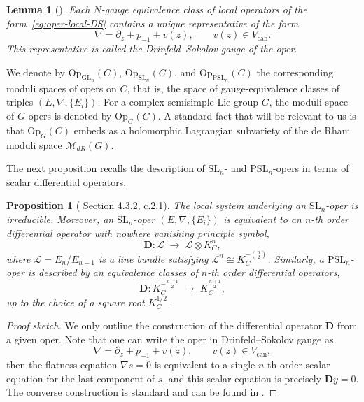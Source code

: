 \documentclass[twoside, 11pt]{article}
\numberwithin{equation}{section}
\theoremstyle{theorem}
\numberwithin{theorem}{section}
\newtheorem{lemma}[lemma]{Lemma}
\newtheorem{proposition}[proposition]{Proposition}
\theoremstyle{definition}
\begin{document}
\begin{lemma}[\cite{BD05}]\label{lem:DS-gauge}
Each $N$-gauge equivalence class of local operators of the form~\eqref{eq:oper-local-DS}
contains a unique representative of the form
\[
\nabla=\partial_z+p_{-1}+v(z),
\qquad v(z)\in V_{\mathrm{can}}.
\]
This representative is called the \emph{Drinfeld--Sokolov gauge} of the oper.
\end{lemma}

We denote by $\mathrm{Op}_{\mathrm{GL}_n}(C)$, $\mathrm{Op}_{\mathrm{SL}_n}(C)$, and $\mathrm{Op}_{\mathrm{PSL}_n}(C)$ the corresponding moduli spaces of opers on $C$, that is, the space of gauge-equivalence classes of triples $(E,\nabla,\{E_i\})$. 
For a complex semisimple Lie group $G$, the moduli space of $G$-opers is denoted by $\mathrm{Op}_G(C)$. 
A standard fact that will be relevant to us is that $\mathrm{Op}_G(C)$ embeds as a holomorphic Lagrangian subvariety of the de Rham moduli space $\mathcal M_{dR}(G)$.

The next proposition recalls the description of $\mathrm{SL}_n$- and $\mathrm{PSL}_n$-opers in terms of scalar differential operators.
\begin{proposition}[\cite{We15} Section 4.3.2, \cite{BD05} c.2.1]\label{p:oper equ d.o.}
The local system underlying an $\mathrm{SL}_n$-oper is irreducible. 
Moreover, an \( \mathrm{SL}_n \)-oper \( (E, \nabla, \{ E_i \}) \) is equivalent to an \( n \)-th order differential operator with nowhere vanishing principle symbol, 
\begin{equation}\label{e:diff oper for sln oper}
\mathbf{D}: \mathcal{L} \;\longrightarrow\; \mathcal{L} \otimes K_C^{n},
\end{equation}
where \( \mathcal{L} = E_n / E_{n-1} \) is a line bundle satisfying \( \mathcal{L}^n \cong K_C^{-\binom{n}{2}} \). Similarly, a $\mathrm{PSL}_n$-oper is described by an equivalence classes of \( n \)-th order differential operators,
\[
\mathbf{D} : K_C^{-\frac{n-1}{2}} \;\longrightarrow\; K_C^{\frac{n+1}{2}},
\]  
up to the choice of a square root $K_C^{1/2}$.
\end{proposition}

\begin{proof}[Proof sketch]
We only outline the construction of the differential operator $\mathbf{D}$ from a given oper. Note that one can write the oper in Drinfeld--Sokolov gauge as
\[
\nabla=\partial_z+p_{-1}+v(z),
\qquad v(z)\in V_{\mathrm{can}},
\]
then the flatness equation $\nabla s=0$ is equivalent to a single $n$-th order scalar equation for the last component of $s$, and this scalar equation is precisely $\mathbf{D}y=0$. The converse construction is standard and can be found in \cite[\S 4.3.2]{We15}.
\end{proof}
\end{document}
